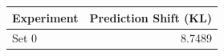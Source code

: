 \begin{tabular}{lr}
\toprule
Experiment & Prediction Shift (KL) \\
\midrule
Set 0 & 8.7489 \\
\bottomrule
\end{tabular}
